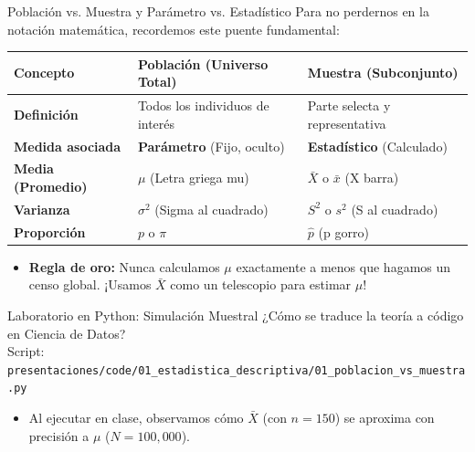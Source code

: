 \begin{frame}{Población vs. Muestra y Parámetro vs. Estadístico}
  Para no perdernos en la notación matemática, recordemos este puente fundamental:
  
  \vspace{0.4em}
  \begin{center}
    \small
    \begin{tabular}{p{3.2cm} p{4.6cm} p{4.6cm}}
      \toprule
      \textbf{Concepto} & \textbf{Población (Universo Total)} & \textbf{Muestra (Subconjunto)} \\
      \midrule
      \textbf{Definición} & Todos los individuos de interés & Parte selecta y representativa \\
      \textbf{Medida asociada} & \textbf{Parámetro} (Fijo, oculto) & \textbf{Estadístico} (Calculado) \\
      \textbf{Media (Promedio)} & $\mu$ (Letra griega mu) & $\bar{X}$ o $\bar{x}$ (X barra) \\
      \textbf{Varianza} & $\sigma^2$ (Sigma al cuadrado) & $S^2$ o $s^2$ (S al cuadrado) \\
      \textbf{Proporción} & $p$ o $\pi$ & $\hat{p}$ (p gorro) \\
      \bottomrule
    \end{tabular}
  \end{center}

  \vspace{0.4em}
  \pause
  \begin{itemize}
    \item \textbf{Regla de oro:} Nunca calculamos $\mu$ exactamente a menos que hagamos un censo global. ¡Usamos $\bar{X}$ como un telescopio para estimar $\mu$!
  \end{itemize}
\end{frame}

\begin{frame}{Laboratorio en Python: Simulación Muestral}
  ¿Cómo se traduce la teoría a código en Ciencia de Datos? 
  \\ Script: \texttt{\footnotesize presentaciones/code/01\_estadistica\_descriptiva/01\_poblacion\_vs\_muestra.py}
  
  \vspace{0.2em}
  {\lstset{basicstyle=\ttfamily\tiny, aboveskip=0.2em, belowskip=0.2em}
  
  }

  \vspace{0.2em}
  \begin{itemize}
    \item Al ejecutar en clase, observamos cómo $\bar{X}$ (con $n=150$) se aproxima con precisión a $\mu$ ($N=100,000$).
  \end{itemize}
\end{frame}

